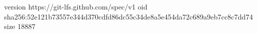 version https://git-lfs.github.com/spec/v1
oid sha256:52e121b73557e344d370cdfd86dc55c34de8a5e454da72c689a9eb7cc8c7dd74
size 18887

